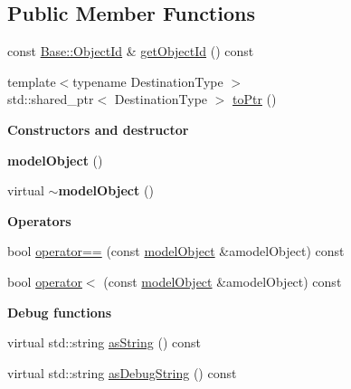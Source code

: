 \subsection*{Public Member Functions}
\begin{DoxyCompactItemize}
\item 
const \hyperlink{class_base_1_1_object_id}{Base\+::\+Object\+Id} \& \hyperlink{class_model_1_1_model_object_afc50aa1e512814a9b6c37a4d3f8b4a97}{get\+Object\+Id} () const 
\item 
{\footnotesize template$<$typename Destination\+Type $>$ }\\std\+::shared\+\_\+ptr$<$ Destination\+Type $>$ \hyperlink{class_model_1_1_model_object_a5330f9a80aeecb0ffe5110fc74258dcb}{to\+Ptr} ()
\end{DoxyCompactItemize}
\begin{Indent}{\bf Constructors and destructor}\par
\begin{DoxyCompactItemize}
\item 
{\bfseries model\+Object} ()\hypertarget{class_model_1_1_model_object_aec6051457cc42ff15ad76dea42278cec}{}\label{class_model_1_1_model_object_aec6051457cc42ff15ad76dea42278cec}

\item 
virtual {\bfseries $\sim$\+model\+Object} ()\hypertarget{class_model_1_1_model_object_a83cf28d0263fca8bbb4003253f767d22}{}\label{class_model_1_1_model_object_a83cf28d0263fca8bbb4003253f767d22}

\end{DoxyCompactItemize}
\end{Indent}
\begin{Indent}{\bf Operators}\par
\begin{DoxyCompactItemize}
\item 
bool \hyperlink{class_model_1_1_model_object_a4dd43ca01fedf5452e9990c1954ada7b}{operator==} (const \hyperlink{class_model_1_1_model_object}{model\+Object} \&a\+model\+Object) const
\item 
bool \hyperlink{class_model_1_1_model_object_a8f5b0be9dabedf96e17cf26dfaa58109}{operator$<$} (const \hyperlink{class_model_1_1_model_object}{model\+Object} \&a\+model\+Object) const
\end{DoxyCompactItemize}
\end{Indent}
\begin{Indent}{\bf Debug functions}\par
\begin{DoxyCompactItemize}
\item 
virtual std\+::string \hyperlink{class_model_1_1_model_object_a9db00b9150a932a1637e425f24c0bdf0}{as\+String} () const 
\item 
virtual std\+::string \hyperlink{class_model_1_1_model_object_aced22b0b0ee637c598c463de6a1d8d03}{as\+Debug\+String} () const 
\end{DoxyCompactItemize}
\end{Indent}


